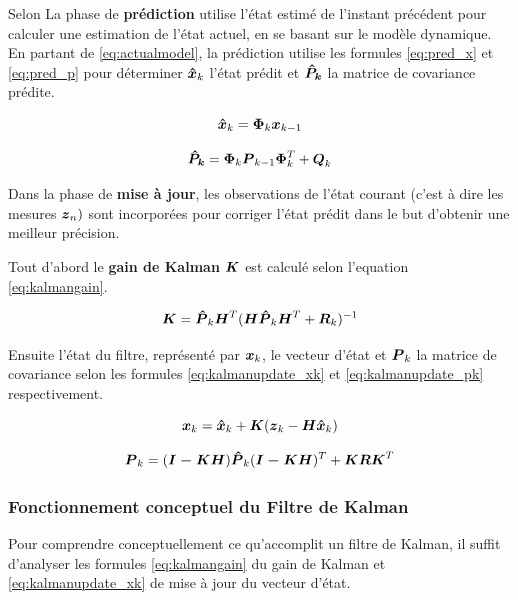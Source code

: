 \documentclass[12pt,a4paper]{report}
\begin{document}
	\para Selon \cite{menegatti_generalized_2016} La phase de \textbf{prédiction} utilise l'état estimé de l'instant précédent pour calculer une estimation de l'état actuel, en se basant sur le modèle dynamique. En partant de \ref{eq:actualmodel}, la prédiction utilise les formules \ref{eq:pred_x} et \ref{eq:pred_p} pour déterminer $\boldsymbol{\hat{x}}_k$ l'état prédit et $\boldsymbol{\hat{P}_k}$ la matrice de covariance prédite.
	
	\begin{equation}
		\label{eq:pred_x}
		\boldsymbol{\hat{x}}_k = \boldsymbol{\Phi}_k \boldsymbol{x}_{k-1}
	\end{equation}
	
	\begin{equation}
		\label{eq:pred_p}
		\boldsymbol{\hat{P}_k} = \boldsymbol{\Phi}_k \boldsymbol{P}_{k-1} \boldsymbol{\Phi}_k^T + \boldsymbol{Q}_k
	\end{equation}
	
	
	
	\para Dans la phase de \textbf{mise à jour}, les observations de l'état courant (c'est à dire les mesures $\boldsymbol{z}_n)$ sont incorporées pour corriger l'état prédit dans le but d'obtenir une meilleur précision.
	
	\para Tout d'abord le \textbf{gain de Kalman} $\boldsymbol{K}$ est calculé selon l'equation \ref{eq:kalmangain}.
	
	\begin{equation}
	\label{eq:kalmangain}
	\boldsymbol{K} = \boldsymbol{\hat{P}}_k \boldsymbol{H}^T (\boldsymbol{H} \boldsymbol{\hat{P}}_k \boldsymbol{H}^T + \boldsymbol{R}_k ) ^{-1}
	\end{equation}
	
	
	\para Ensuite l'état du filtre, représenté par $\boldsymbol{x}_k$, le vecteur d'état et $\boldsymbol{P}_k$ la matrice de covariance selon les formules \ref{eq:kalmanupdate_xk} et \ref{eq:kalmanupdate_pk} respectivement.
	
	\begin{equation}
	\label{eq:kalmanupdate_xk}
	\boldsymbol{x}_k = \boldsymbol{\hat{x}}_k + \boldsymbol{K} (\boldsymbol{z}_k - \boldsymbol{H \hat{x}}_k)
	\end{equation}
	
	\begin{equation}
	\label{eq:kalmanupdate_pk}
	\boldsymbol{P}_k = (\boldsymbol{I-KH})\boldsymbol{\hat{P}}_k(\boldsymbol{I-KH})^T + \boldsymbol{KRK}^T
	\end{equation}


	\subsubsection{Fonctionnement conceptuel du Filtre de Kalman}
	Pour comprendre conceptuellement ce qu'accomplit un filtre de Kalman, il suffit d'analyser les formules \ref{eq:kalmangain} du gain de Kalman et \ref{eq:kalmanupdate_xk} de mise à jour du vecteur d'état.
	
\end{document}
